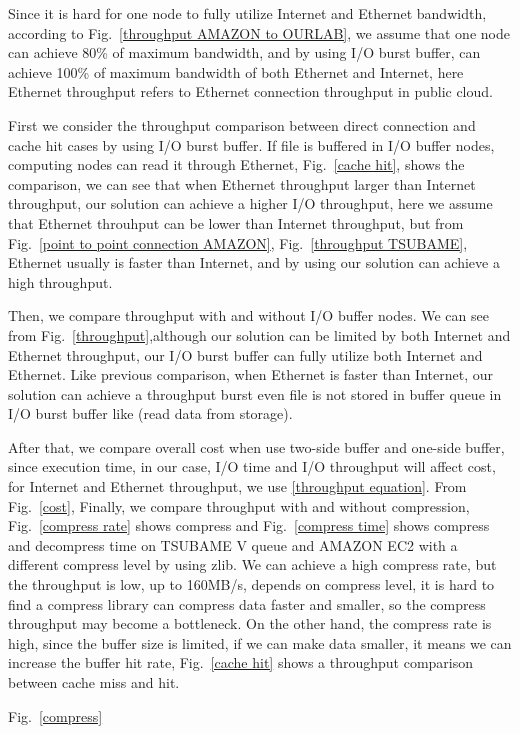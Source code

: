 Since it is hard for one node to fully utilize Internet and Ethernet bandwidth, according to Fig.~\ref{throughput AMAZON to OURLAB}, we assume that one node can achieve 80\% of maximum bandwidth, and by using I/O burst buffer, can achieve 100\% of maximum bandwidth of both Ethernet and Internet, here Ethernet throughput refers to Ethernet connection throughput in public cloud.

First we consider the throughput comparison between direct connection and cache hit cases by using I/O burst buffer.
If file is buffered in I/O buffer nodes, computing nodes can read it through Ethernet, Fig.~\ref{cache hit}, shows the comparison, we can see that when Ethernet throughput larger than Internet throughput, our solution can achieve a higher I/O throughput, here we assume that Ethernet throuhput can be lower than Internet throughput, but from Fig.~\ref{point to point connection AMAZON}, Fig.~\ref{throughput TSUBAME}, Ethernet usually is faster than Internet, and by using our solution can achieve a high throughput.

Then, we compare throughput with and without I/O buffer nodes.
We can see from Fig.~\ref{throughput},although our solution can be limited by both Internet and Ethernet throughput, our I/O burst buffer can fully utilize both Internet and Ethernet. Like previous comparison, when Ethernet is faster than Internet, our solution can achieve a throughput burst even file is not stored in buffer queue in I/O burst buffer like (read data from storage).

After that, we compare overall cost when use two-side buffer and one-side buffer, since execution time, in our case, I/O time and I/O throughput will affect cost, for Internet and Ethernet throughput, we use \ref{throughput equation}.
From Fig.~\ref{cost}, 
Finally, we compare throughput with and without compression, Fig.~\ref{compress rate} shows compress and Fig.~\ref{compress time} shows compress and decompress time on TSUBAME V queue and AMAZON EC2 with a different compress level by using zlib\cite{zlib}.
We can achieve a high compress rate, but the throughput is low, up to 160MB/s, depends on compress level, it is hard to find a compress library can compress data faster and smaller, so the compress throughput may become a bottleneck.
On the other hand, the compress rate is high, since the buffer size is limited, if we can make data smaller, it means we can increase the buffer hit rate, Fig.~\ref{cache hit} shows a throughput comparison between cache miss and hit.

Fig.~\ref{compress}